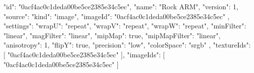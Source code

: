 {
  "id": "0acf4ac0c1deda00be5ce2385e34c5ec",
  "name": "Rock ARM",
  "version": 1,
  "source": {
    "kind": "image",
    "imageId": "0acf4ac0c1deda00be5ce2385e34c5ec"
  },
  "settings": {
    "wrapU": "repeat",
    "wrapV": "repeat",
    "wrapW": "repeat",
    "minFilter": "linear",
    "magFilter": "linear",
    "mipMap": true,
    "mipMapFilter": "linear",
    "anisotropy": 1,
    "flipY": true,
    "precision": "low",
    "colorSpace": "srgb"
  },
  "textureIds": [
    "0acf4ac0c1deda00be5ce2385e34c5ec"
  ],
  "imageIds": [
    "0acf4ac0c1deda00be5ce2385e34c5ec"
  ]
}
